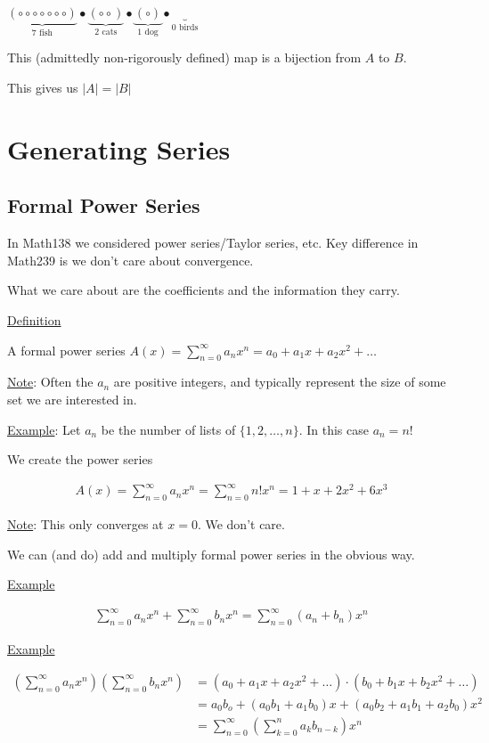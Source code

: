 \documentclass{article}
\begin{document}
$\underbrace{(\circ \circ \circ \circ \circ \circ \circ)}_{\text{7 fish}} \bullet \underbrace{(\circ \circ)}_{\text{2 cats}} \bullet \underbrace{(\circ)}_{\text{1 dog}} \bullet \underbrace{}_{\text{0 birds}}$

This (admittedly non-rigorously defined) map is a bijection from $A$ to $B$. 

This gives us $|A| = |B|$



\section{Generating Series}

\subsection{Formal Power Series}

In Math138 we considered power series/Taylor series, etc. Key difference in Math239 is we don't care about convergence. 

What we care about are the coefficients and the information they carry. 

\underline{Definition}

A formal power series $A(x) = \sum_{n=0}^{\infty} a_nx^n = a_0 + a_1x + a_2x^2 + \ldots$

\underline{Note}: Often the $a_n$ are positive integers, and typically represent the size of some set we are interested in. 

\underline{Example}: Let $a_n$ be the number of lists of $\{1,2,\ldots,n\}$. In this case $a_n = n!$

We create the power series

\begin{align*}
A(x) = \sum_{n=0}^{\infty} a_nx^n = \sum_{n=0}^{\infty}n!x^n = 1 + x + 2x^2 + 6x^3
\end{align*}

\underline{Note}: This only converges at $x=0$. We don't care. 

We can (and do) add and multiply formal power series in the obvious way. 

\underline{Example}

\begin{align*}
\sum_{n=0}^{\infty}a_nx^n + \sum_{n=0}^{\infty}b_nx^n = \sum_{n=0}^{\infty}(a_n+b_n)x^n
\end{align*}

\underline{Example}

\begin{align*}
(\sum_{n=0}^{\infty}a_nx^n)(\sum_{n=0}^{\infty}b_nx^n) &= 
(a_0 + a_1x + a_2x^2 + \ldots) \cdot (b_0 + b_1x + b_2x^2 + \ldots) \\
&= a_0b_o + (a_0b_1 + a_1b_0)x + (a_0b_2 + a_1b_1 + a_2b_0)x^2 \\
&= \sum_{n=0}^{\infty} (\sum_{k=0}^{n}a_kb_{n-k})x^n
\end{align*}
\end{document}
